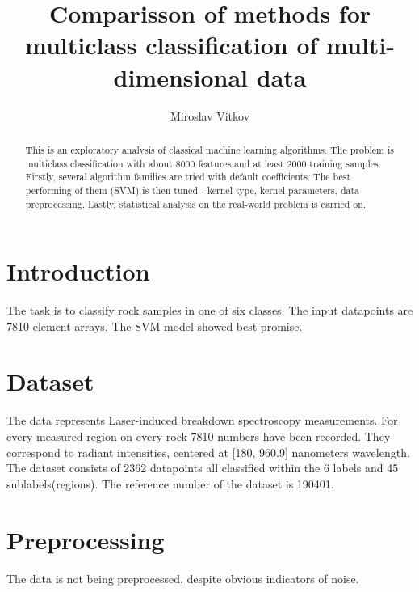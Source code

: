 \documentclass{article}
\title{Comparisson of methods for multiclass classification of multi-dimensional data}
\author{Miroslav Vitkov}
\begin{document}
\maketitle


\begin{abstract}
This is an exploratory analysis of classical machine learning algorithms.
The problem is multiclass classification with about 8000 features and at least 2000 training samples.
Firstly, several algorithm families are tried with default coefficients.
The best performing of them (SVM) is then tuned - kernel type, kernel parameters, data preprocessing.
Lastly, statistical analysis on the real-world problem is carried on.
\end{abstract}


\section{Introduction}
The task is to classify rock samples in one of six classes.
The input datapoints are 7810-element arrays.
The SVM model showed best promise.


\section{Dataset}
The data represents Laser-induced breakdown spectroscopy\cite{libs_intro} measurements.
For every measured region on every rock 7810 numbers have been recorded.
They correspond to radiant intensities, centered at [180, 960.9] nanometers wavelength.
\\
The dataset consists of 2362 datapoints all classified within the 6 labels and 45 sublabels(regions).
The reference number of the dataset is 190401.


\section{Preprocessing}
The data is not being preprocessed, despite obvious indicators of noise.
\end{document}

